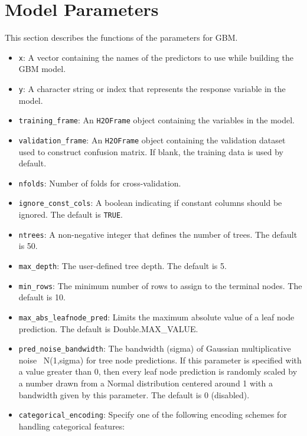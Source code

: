 \waterExampleInR


\newpage
\waterExampleInPython



\section{Model Parameters}
\label{ssec:Model Parameters}
This section describes the functions of the parameters for GBM. 
\begin{itemize}
\item {\texttt{x}}: A vector containing the names of the predictors to use while building the GBM model. 
\item {\texttt{y}}: A character string or index that represents the response variable in the model.  
\item {\texttt{training\_frame}}: An \texttt{H2OFrame} object containing the variables in the model. 
\item {\texttt{validation\_frame}}: An \texttt{H2OFrame} object containing the validation dataset used to construct confusion matrix. If  blank, the training data is used by default.
\item {\texttt{nfolds}}: Number of folds for cross-validation. 
\item {\texttt{ignore\_const\_cols}}: A boolean indicating if constant columns should be ignored.  The default is  {\texttt{TRUE}}.
\item {\texttt{ntrees}}: A non-negative integer that defines the number of trees. The default is 50.
\item {\texttt{max\_depth}}: The user-defined tree depth. The default is 5.
\item {\texttt{min\_rows}}: The minimum number of rows to assign to the terminal nodes. The default is 10.
\item {\texttt{max\_abs\_leafnode\_pred}}: Limits the maximum absolute value of a leaf node prediction. The default is Double.MAX\_VALUE.
\item {\texttt{pred\_noise\_bandwidth}}: The bandwidth (sigma) of Gaussian multiplicative noise ~N(1,sigma) for tree node predictions. If this parameter is specified with a value greater than 0, then every leaf node prediction is randomly scaled by a number drawn from a Normal distribution centered around 1 with a bandwidth given by this parameter. The default is 0 (disabled).
\item \texttt{categorical\_encoding}:  Specify one of the following encoding schemes for handling categorical features:

\end{itemize}
